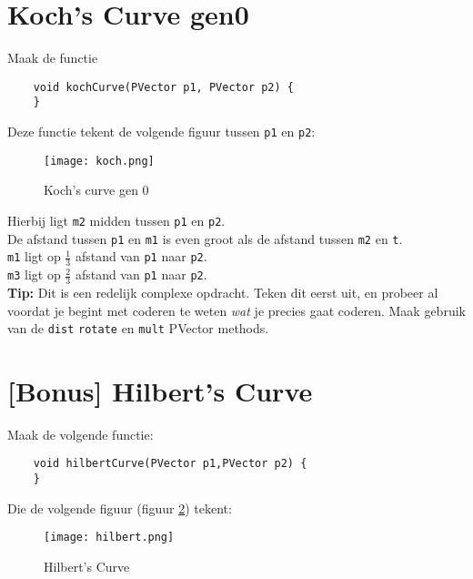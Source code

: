 \section{Koch's Curve gen0}
Maak de functie
\begin{lstlisting}
	void kochCurve(PVector p1, PVector p2) {
	}
\end{lstlisting}
Deze functie tekent de volgende figuur tussen \texttt{p1} en \texttt{p2}:
\begin{figure}[h!]
	\centering
	\texttt{[image: koch.png]}
	\label{fig:koch}
	\caption{Koch's curve gen 0}
\end{figure}
Hierbij ligt \texttt{m2} midden tussen \texttt{p1} en \texttt{p2}.\\
De afstand tussen \texttt{p1} en \texttt{m1} is even groot als de afstand tussen \texttt{m2} en \texttt{t}.\\
\texttt{m1} ligt op $\frac{1}{3}$ afstand van \texttt{p1} naar \texttt{p2}.\\
\texttt{m3} ligt op $\frac{2}{3}$ afstand van \texttt{p1} naar \texttt{p2}.\\
\textbf{Tip:} Dit is een redelijk complexe opdracht. Teken dit eerst uit, en probeer al voordat je begint met coderen te weten \textit{wat} je precies gaat coderen. Maak gebruik van de \texttt{dist} \texttt{rotate} en \texttt{mult} PVector methods.

\section{[Bonus] Hilbert's Curve}
Maak de volgende functie:
\begin{lstlisting}
	void hilbertCurve(PVector p1,PVector p2) {
	} 
\end{lstlisting}
Die de volgende figuur (figuur \ref{fig:koch}) tekent:
\begin{figure}[h!]
	\centering
	\texttt{[image: hilbert.png]}
	\label{fig:koch}
	\caption{Hilbert's Curve}
\end{figure}

